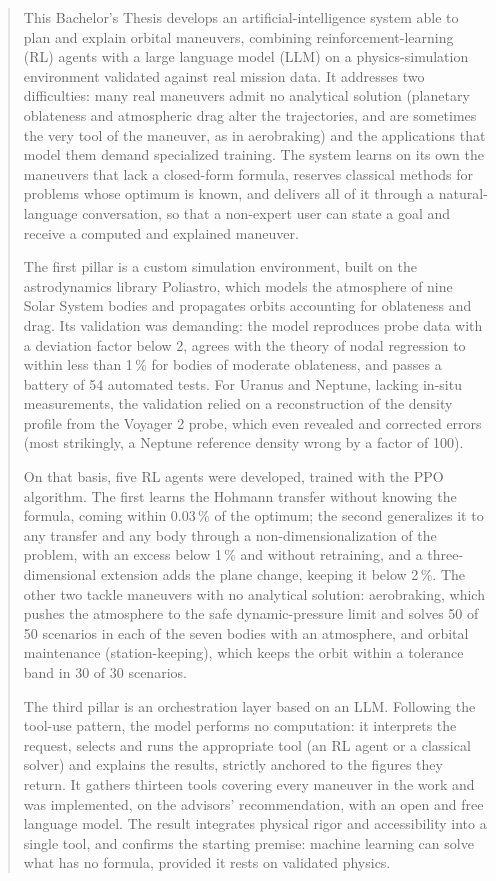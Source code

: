 \begin{abstract}


This Bachelor's Thesis develops an artificial-intelligence system able to plan and explain orbital maneuvers, combining reinforcement-learning (RL) agents with a large language model (LLM) on a physics-simulation environment validated against real mission data. It addresses two difficulties: many real maneuvers admit no analytical solution (planetary oblateness and atmospheric drag alter the trajectories, and are sometimes the very tool of the maneuver, as in aerobraking) and the applications that model them demand specialized training. The system learns on its own the maneuvers that lack a closed-form formula, reserves classical methods for problems whose optimum is known, and delivers all of it through a natural-language conversation, so that a non-expert user can state a goal and receive a computed and explained maneuver.

The first pillar is a custom simulation environment, built on the astrodynamics library Poliastro, which models the atmosphere of nine Solar System bodies and propagates orbits accounting for oblateness and drag. Its validation was demanding: the model reproduces probe data with a deviation factor below 2, agrees with the theory of nodal regression to within less than 1\,\% for bodies of moderate oblateness, and passes a battery of 54 automated tests. For Uranus and Neptune, lacking in-situ measurements, the validation relied on a reconstruction of the density profile from the Voyager 2 probe, which even revealed and corrected errors (most strikingly, a Neptune reference density wrong by a factor of 100).

On that basis, five RL agents were developed, trained with the PPO algorithm. The first learns the Hohmann transfer without knowing the formula, coming within 0.03\,\% of the optimum; the second generalizes it to any transfer and any body through a non-dimensionalization of the problem, with an excess below 1\,\% and without retraining, and a three-dimensional extension adds the plane change, keeping it below 2\,\%. The other two tackle maneuvers with no analytical solution: aerobraking, which pushes the atmosphere to the safe dynamic-pressure limit and solves 50 of 50 scenarios in each of the seven bodies with an atmosphere, and orbital maintenance (station-keeping), which keeps the orbit within a tolerance band in 30 of 30 scenarios.

The third pillar is an orchestration layer based on an LLM. Following the tool-use pattern, the model performs no computation: it interprets the request, selects and runs the appropriate tool (an RL agent or a classical solver) and explains the results, strictly anchored to the figures they return. It gathers thirteen tools covering every maneuver in the work and was implemented, on the advisors' recommendation, with an open and free language model. The result integrates physical rigor and accessibility into a single tool, and confirms the starting premise: machine learning can solve what has no formula, provided it rests on validated physics.
\end{abstract}